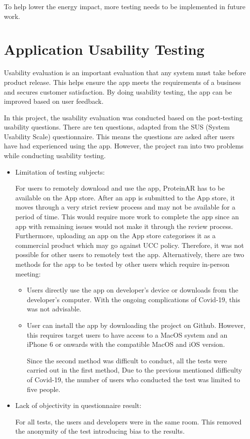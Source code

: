 To help lower the energy impact, more testing needs to be implemented in future work. 

\section{Application Usability Testing}

Usability evaluation is an important evaluation that any system must take before product release. This helps ensure the app meets the requirements of a business and secures customer satisfaction. By doing usability testing, the app can be improved based on user feedback. 

In this project, the usability evaluation was conducted based on the post-testing usability questions. There are ten questions, adapted from the SUS (System Usability Scale) questionnaire. This means the questions are asked after users have had experienced using the app. 
However, the project ran into two problems while conducting usability testing. 

\begin{itemize}
\item Limitation of testing subjects: 

For users to remotely download and use the app, ProteinAR has to be available on the App store. After an app is submitted to the App store, it moves through a very strict review process and may not be available for a period of time. This would require more work to complete the app since an app with remaining issues would not make it through the review process. Furthermore, uploading an app on the App store categorises it as a commercial product which may go against UCC policy. Therefore, it was not possible for other users to remotely test the app. Alternatively, there are two methods for the app to be tested by other users which require in-person meeting:
	\begin{itemize}
		\item Users directly use the app on developer's device or downloads from the developer's computer. With the ongoing complications of Covid-19, this was not advisable.
		\item User can install the app by downloading the project on Github. However, this requires target users to have access to a MacOS system and an iPhone 6 or onwards with the compatible MacOS and iOS version.

Since the second method was difficult to conduct, all the tests were carried out in the first method, Due to the previous mentioned difficulty of Covid-19, the number of users who conducted the test was limited to five people.

	\end{itemize}
\item Lack of objectivity in questionnaire result:

For all tests, the users and developers were in the same room. This removed the anonymity of the test introducing bias to the results.

\end{itemize}

